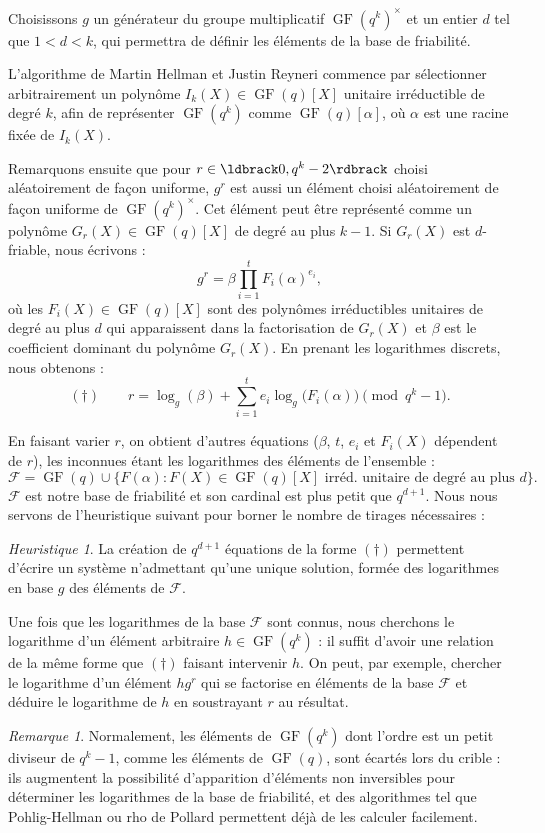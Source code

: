 \documentclass[a4paper, titlepage, 11pt]{article}
\theoremstyle{definition}
\theoremstyle{remark}
\newtheorem{rema}[theo]{Remarque}
\newtheorem{heur}[theo]{Heuristique}
\def\gf{\operatorname{GF}}
\begin{document}
Choisissons $g$ un générateur du groupe multiplicatif $\gf(q^k)^\times$ et un entier $d$ tel que $1 < d < k$, qui permettra de définir les éléments de la base de friabilité.

L'algorithme de Martin Hellman et Justin Reyneri \cite{hellman1982} commence par sélectionner arbitrairement un polynôme $I_k(X) \in \gf(q)[X]$ unitaire irréductible de degré $k$, afin de représenter $\gf(q^k)$ comme $\gf(q)[\alpha]$, où $\alpha$ est une racine fixée de $I_k(X)$.

Remarquons ensuite que pour $r \in \ldbrack 0, q^k - 2 \rdbrack$ choisi aléatoirement de façon uniforme, $g^r$ est aussi un élément choisi aléatoirement de façon uniforme de $\gf(q^k)^\times$. Cet élément peut être représenté comme un polynôme $G_r(X) \in \gf(q)[X]$ de degré au plus $k-1$. Si $G_r(X)$ est $d$-friable, nous écrivons :
$$g^r = \beta \prod_{i=1}^{t} F_i(\alpha)^{e_i},$$
où les $F_i(X)\in \gf(q)[X]$ sont des polynômes irréductibles unitaires de degré au plus $d$ qui apparaissent dans la factorisation de $G_r(X)$ et $\beta$ est le coefficient dominant du polynôme $G_r(X)$. En prenant les logarithmes discrets, nous obtenons :
$$(\dagger) \qquad r = \log_g(\beta) + \sum_{i=1}^t e_i\log_g\big(F_i(\alpha)\big) \pmod{q^k - 1}.$$

En faisant varier $r$, on obtient d'autres équations ($\beta$, $t$, $e_i$ et $F_i(X)$ dépendent de $r$), les inconnues étant les logarithmes des éléments de l'ensemble :
$$\mathcal{F} =  \gf(q) \cup \{F(\alpha) : F(X) \in \gf(q)[X] \text{ irréd. unitaire de degré au plus } d \}.$$
$\mathcal{F}$ est notre base de friabilité et son cardinal est plus petit que $q^{d+1}$. Nous nous servons de l'heuristique suivant pour borner le nombre de tirages nécessaires :
\begin{heur}
La création de $q^{d+1}$ équations de la forme $(\dagger)$ permettent d'écrire un système n'admettant qu'une unique solution, formée des logarithmes en base $g$ des éléments de $\mathcal{F}$.
\end{heur}

Une fois que les logarithmes de la base $\mathcal{F}$ sont connus, nous cherchons le logarithme d'un élément arbitraire $h \in \gf(q^k)$ : il suffit d'avoir une relation de la même forme que $(\dagger)$ faisant intervenir $h$. On peut, par exemple, chercher le logarithme d'un élément $hg^r$ qui se factorise en éléments de la base $\mathcal{F}$ et déduire le logarithme de $h$ en soustrayant $r$ au résultat.

\begin{rema}
Normalement, les éléments de $\gf(q^k)$ dont l'ordre est un petit diviseur de $q^k-1$, comme les éléments de $\gf(q)$, sont écartés lors du crible : ils augmentent la possibilité d'apparition d'éléments non inversibles pour déterminer les logarithmes de la base de friabilité, et des algorithmes tel que Pohlig-Hellman \cite{pohligHellman1978} ou rho de Pollard \cite{pollard1978} permettent déjà de les calculer facilement.
\end{rema}
\end{document}
